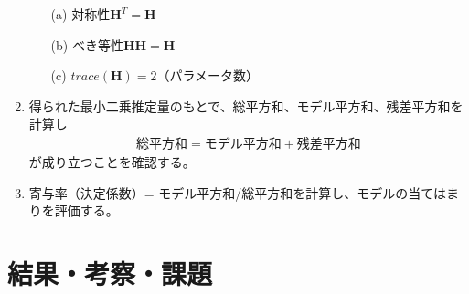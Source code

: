 \documentclass[12pt]{jarticle}
\begin{document}
\begin{enumerate}
          \begin{itemize}
              \item [(a)]対称性$\bm H^T=\bm H$
              \item [(b)]べき等性$\bm H \bm H = \bm H$
              \item [(c)]$trace(\bm H)= 2$（パラメータ数）
          \end{itemize}
    \item 得られた最小二乗推定量のもとで、総平方和、モデル平方和、残差平方和を計算し
          \begin{eqnarray}
              総平方和=モデル平方和+残差平方和
          \end{eqnarray}
          が成り立つことを確認する。
    \item 寄与率（決定係数）= モデル平方和/総平方和を計算し、モデルの当てはまりを評価する。
\end{enumerate}

\clearpage

\section{結果・考察・課題}
\end{document}
